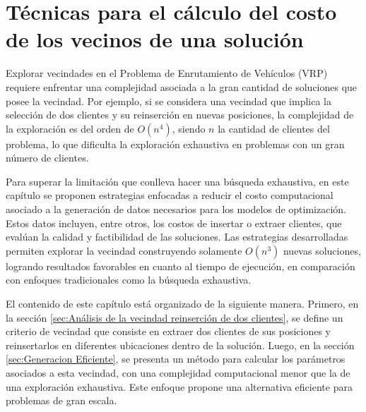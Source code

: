 \documentclass[12pt]{report}
\begin{document}
	\chapter{Técnicas para el cálculo del costo de los vecinos de una solución}

	Explorar vecindades en el Problema de Enrutamiento de Vehículos (VRP) requiere enfrentar una complejidad asociada a la gran cantidad de soluciones que posee la vecindad. Por ejemplo, si se considera una vecindad que implica la selección de dos clientes y su reinserción en nuevas posiciones, la complejidad de la exploración es del orden de $O(n^4)$, siendo $n$ la cantidad de clientes del problema, lo que dificulta la exploración exhaustiva en problemas con un gran número de clientes.

	Para superar la limitación que conlleva hacer una búsqueda exhaustiva, en este capítulo se proponen estrategias enfocadas a reducir el costo computacional asociado a la generación de datos necesarios para los modelos de optimización. Estos datos incluyen, entre otros, los costos de insertar o extraer clientes, que evalúan la calidad y factibilidad de las soluciones. Las estrategias desarrolladas permiten explorar la vecindad construyendo solamente $O(n^3)$ nuevas soluciones, logrando resultados favorables en cuanto al tiempo de ejecución, en comparación con enfoques tradicionales como la búsqueda exhaustiva.

	El contenido de este capítulo está organizado de la siguiente manera. Primero, en la sección \ref{sec:Análisis de la vecindad reinserción de dos clientes}, se define un criterio de vecindad que consiste en extraer dos clientes de sus posiciones y reinsertarlos en diferentes ubicaciones dentro de la solución. Luego, en la sección \ref{sec:Generacion Eficiente}, se presenta un método para calcular los parámetros asociados a esta vecindad, con una complejidad computacional menor que la de una exploración exhaustiva. Este enfoque propone una alternativa eficiente para problemas de gran escala.
\end{document}

